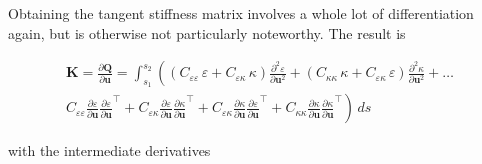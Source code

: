 Obtaining the tangent stiffness matrix involves a whole lot of differentiation again, but is otherwise not particularly noteworthy.
The result is

\begin{multline}
\boldsymbol{K} = \frac{\partial \boldsymbol{Q}}{\partial \boldsymbol{u}} = \int_{s_1}^{s_2} \left( \left( C_{\varepsilon\varepsilon}\,\varepsilon + C_{\varepsilon\kappa}\,\kappa \right) \frac{\partial^2 \varepsilon}{\partial \boldsymbol{u}^2} + \left( C_{\kappa\kappa}\,\kappa + C_{\varepsilon\kappa}\,\varepsilon \right) \frac{\partial^2 \kappa}{\partial \boldsymbol{u}^2} + \ldots \right. \\ \left. C_{\varepsilon\varepsilon}\frac{\partial \varepsilon}{\partial \boldsymbol{u}}\frac{\partial \varepsilon}{\partial \boldsymbol{u}}^\intercal + C_{\varepsilon\kappa}\frac{\partial \varepsilon}{\partial \boldsymbol{u}}\frac{\partial \kappa}{\partial \boldsymbol{u}}^\intercal + C_{\varepsilon\kappa}\frac{\partial \kappa}{\partial \boldsymbol{u}}\frac{\partial \varepsilon}{\partial \boldsymbol{u}}^\intercal + C_{\kappa\kappa}\frac{\partial \kappa}{\partial \boldsymbol{u}}\frac{\partial \kappa}{\partial \boldsymbol{u}}^\intercal \right)\,ds
\end{multline}

with the intermediate derivatives

